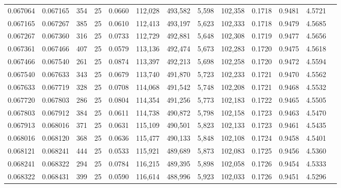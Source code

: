 \begin{tabular}{rrrrrrrrrrrrr}
0.067064 & 0.067165 &   354 &  25 &                                     0.0660 & 112,028 & 493,582 &   5,598 & 102,358 & 0.1718 & 0.9481 & 4.5721 \\
0.067165 & 0.067267 &   385 &  25 &                                     0.0610 & 112,413 & 493,197 &   5,623 & 102,333 & 0.1718 & 0.9479 & 4.5685 \\
0.067267 & 0.067360 &   316 &  25 &                                     0.0733 & 112,729 & 492,881 &   5,648 & 102,308 & 0.1719 & 0.9477 & 4.5656 \\
0.067361 & 0.067466 &   407 &  25 &                                     0.0579 & 113,136 & 492,474 &   5,673 & 102,283 & 0.1720 & 0.9475 & 4.5618 \\
0.067466 & 0.067540 &   261 &  25 &                                     0.0874 & 113,397 & 492,213 &   5,698 & 102,258 & 0.1720 & 0.9472 & 4.5594 \\
0.067540 & 0.067633 &   343 &  25 &                                     0.0679 & 113,740 & 491,870 &   5,723 & 102,233 & 0.1721 & 0.9470 & 4.5562 \\
0.067633 & 0.067719 &   328 &  25 &                                     0.0708 & 114,068 & 491,542 &   5,748 & 102,208 & 0.1721 & 0.9468 & 4.5532 \\
0.067720 & 0.067803 &   286 &  25 &                                     0.0804 & 114,354 & 491,256 &   5,773 & 102,183 & 0.1722 & 0.9465 & 4.5505 \\
0.067803 & 0.067912 &   384 &  25 &                                     0.0611 & 114,738 & 490,872 &   5,798 & 102,158 & 0.1723 & 0.9463 & 4.5470 \\
0.067913 & 0.068016 &   371 &  25 &                                     0.0631 & 115,109 & 490,501 &   5,823 & 102,133 & 0.1723 & 0.9461 & 4.5435 \\
0.068016 & 0.068120 &   368 &  25 &                                     0.0636 & 115,477 & 490,133 &   5,848 & 102,108 & 0.1724 & 0.9458 & 4.5401 \\
0.068121 & 0.068241 &   444 &  25 &                                     0.0533 & 115,921 & 489,689 &   5,873 & 102,083 & 0.1725 & 0.9456 & 4.5360 \\
0.068241 & 0.068322 &   294 &  25 &                                     0.0784 & 116,215 & 489,395 &   5,898 & 102,058 & 0.1726 & 0.9454 & 4.5333 \\
0.068322 & 0.068431 &   399 &  25 &                                     0.0590 & 116,614 & 488,996 &   5,923 & 102,033 & 0.1726 & 0.9451 & 4.5296 \\

\end{tabular}
